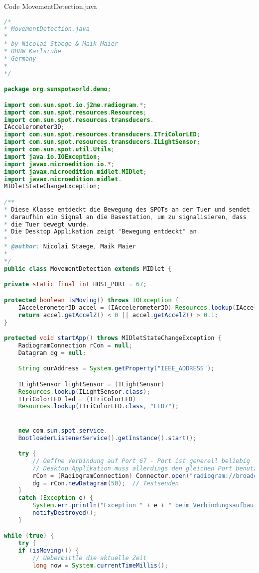 {\huge Code MovementDetection.java}
\begin{lstlisting}[language=Java,caption={Code MovementDetection.java},nolol=true,label=lst:hoststudi,frame=single]
/*
* MovementDetection.java
*
* by Nicolai Staege & Maik Maier
* DHBW Karlsruhe
* Germany
*
*/

package org.sunspotworld.demo;

import com.sun.spot.io.j2me.radiogram.*;
import com.sun.spot.resources.Resources;
import com.sun.spot.resources.transducers.
IAccelerometer3D;
import com.sun.spot.resources.transducers.ITriColorLED;
import com.sun.spot.resources.transducers.ILightSensor;
import com.sun.spot.util.Utils;
import java.io.IOException;
import javax.microedition.io.*;
import javax.microedition.midlet.MIDlet;
import javax.microedition.midlet.
MIDletStateChangeException;

/**
* Diese Klasse entdeckt die Bewegung des SPOTs an der Tuer und sendet
* daraufhin ein Signal an die Basestation, um zu signalisieren, dass
* die Tuer bewegt wurde.
* Die Desktop Applikation zeigt "Bewegung entdeckt" an.
*
* @author: Nicolai Staege, Maik Maier
* 
*/
public class MovementDetection extends MIDlet {

private static final int HOST_PORT = 67;

protected boolean isMoving() throws IOException {
	IAccelerometer3D accel = (IAccelerometer3D) Resources.lookup(IAccelerometer3D.class);
	return accel.getAccelZ() < 0 || accel.getAccelZ() > 0.1;
}

protected void startApp() throws MIDletStateChangeException {
	RadiogramConnection rCon = null;
	Datagram dg = null;

	String ourAddress = System.getProperty("IEEE_ADDRESS");

	ILightSensor lightSensor = (ILightSensor)
	Resources.lookup(ILightSensor.class);
	ITriColorLED led = (ITriColorLED)
	Resources.lookup(ITriColorLED.class, "LED7");


	new com.sun.spot.service.
	BootloaderListenerService().getInstance().start();

	try {
		// Oeffne Verbindung auf Port 67 - Port ist generell beliebig
		// Desktop Applikation muss allerdings den gleichen Port benutzen
		rCon = (RadiogramConnection) Connector.open("radiogram://broadcast:" + HOST_PORT);
		dg = rCon.newDatagram(50);  // Testsenden
	}
	catch (Exception e) {
		System.err.println("Exception " + e + " beim Verbindungsaufbau.");
		notifyDestroyed();
	}

while (true) {
	try {
	if (isMoving()) {
		// Uebermittle die aktuelle Zeit
		long now = System.currentTimeMillis();


\end{lstlisting}
